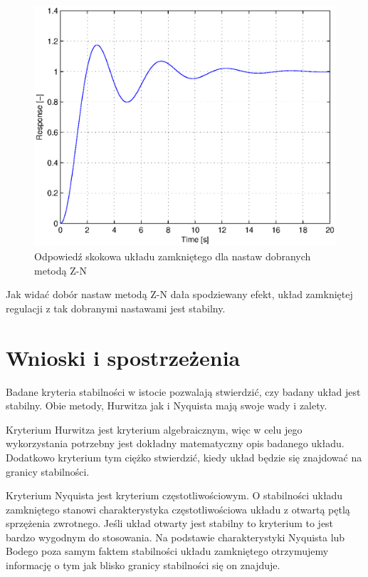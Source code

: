 \documentclass[12pt]{article}
\begin{document}
\begin{figure}[!htb]
	\begin{center}
		\includegraphics[width=15cm]{../res/img/0,18-2,24-0,56_resp_ZN-STD.eps} 
	\end{center}
	\caption{Odpowiedź skokowa układu zamkniętego dla nastaw dobranych metodą Z-N}
\end{figure}

Jak widać dobór nastaw metodą Z-N dała spodziewany efekt, układ zamkniętej
regulacji z tak dobranymi nastawami jest stabilny.

\section{Wnioski i spostrzeżenia}

Badane kryteria stabilności w istocie pozwalają stwierdzić, czy badany układ
jest stabilny. Obie metody, Hurwitza jak i Nyquista mają swoje wady i zalety.

Kryterium Hurwitza jest kryterium algebraicznym, więc w celu jego wykorzystania
potrzebny jest dokładny matematyczny opis badanego układu. Dodatkowo kryterium
tym ciężko stwierdzić, kiedy układ będzie się znajdować na granicy stabilności.

Kryterium Nyquista jest kryterium częstotliwościowym. O stabilności układu
zamkniętego stanowi charakterystyka częstotliwościowa układu z otwartą pętlą
sprzężenia zwrotnego. Jeśli układ otwarty jest stabilny to kryterium to jest
bardzo wygodnym do stosowania. Na podstawie charakterystyki Nyquista lub Bodego
poza samym faktem stabilności układu zamkniętego otrzymujemy informację o tym
jak blisko granicy stabilności się on znajduje.
\end{document}
